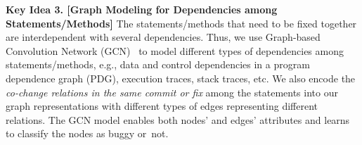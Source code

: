 {\bf Key Idea 3. [Graph Modeling for Dependencies among
    Statements/Methods]} The statements/methods that need to be fixed
together are interdependent with several dependencies. Thus, we use
Graph-based Convolution Network (GCN)~\cite{li2019gcn} to model
different types of dependencies among statements/methods,
e.g., data and control dependencies in a program dependence graph
(PDG), execution traces, stack traces, etc.
We also encode the {\em co-change relations in the same commit or fix}
  among the statements into our graph representations with different
types of edges representing different relations. The GCN model enables
both nodes' and edges' attributes and learns to classify the nodes as
buggy or~not.









